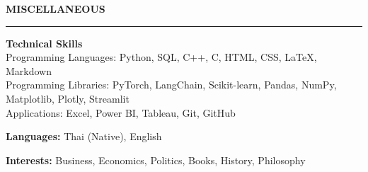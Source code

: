 \documentclass[a4paper, 11pt]{article}
\begin{document}




\vspace{6pt}
\textbf{MISCELLANEOUS}
\vspace{5pt}
{\hrule}
\vspace{6pt}

\textbf{Technical Skills}\\
\hspace*{7pt} Programming Languages: Python, SQL, C++, C, HTML, CSS, LaTeX, Markdown\\
\hspace*{7pt} Programming Libraries: PyTorch, LangChain, Scikit-learn, Pandas, NumPy, Matplotlib, Plotly, Streamlit\\
\hspace*{7pt} Applications: Excel, Power BI, Tableau, Git, GitHub

\textbf{Languages:} Thai (Native), English

\textbf{Interests:} Business, Economics, Politics, Books, History, Philosophy
\end{document}
